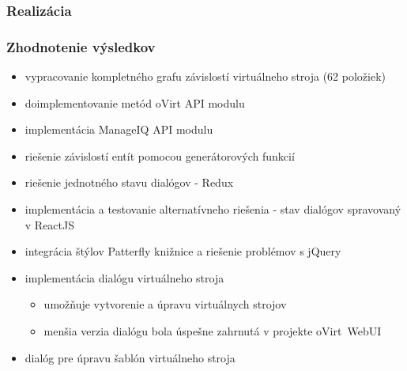 \documentclass[pdf]{beamer}
\begin{document}
\begin{frame}
\frametitle{Realizácia}

\begin{figure}[h]
\label{labelledSelect}
\end{figure}

\begin{figure}[h]
\label{labelledSelect}
\end{figure} 

\begin{figure}[h]
\label{labelledSelect}
\end{figure} 


\begin{figure}[h]
\label{labelledSelect}
\end{figure}

\end{frame}

\begin{frame}
\frametitle{Zhodnotenie výsledkov}

\begin{itemize}
\item vypracovanie kompletného grafu závislostí virtuálneho stroja (62 položiek)
\item doimplementovanie metód oVirt API modulu
\item implementácia ManageIQ API modulu
\item riešenie závislostí entít pomocou generátorových funkcií
\item riešenie jednotného stavu dialógov - Redux
\item implementácia a testovanie alternatívneho riešenia - stav dialógov spravovaný v ReactJS
\item integrácia štýlov Patterfly knižnice a riešenie problémov s jQuery
\item implementácia dialógu virtuálneho stroja
\begin{itemize}
\item umožňuje vytvorenie a úpravu virtuálnych strojov
\item menšia verzia dialógu bola úspešne zahrnutá v projekte oVirt~WebUI
\end{itemize}
\item dialóg pre úpravu šablón virtuálneho stroja
\end{itemize}

\end{frame}
\end{document}
